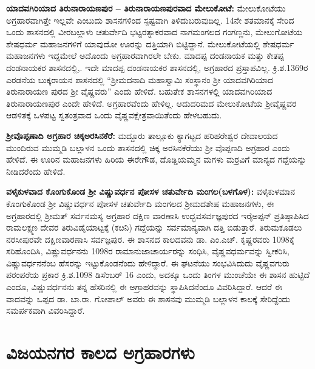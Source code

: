 \textbf{ಯಾದವಗಿರಿಯಾದ ತಿರುನಾರಾಯಣಪುರ – ತಿರುನಾರಾಯಣಪುರವಾದ ಮೇಲುಕೋಟೆ:} ಮೇಲುಕೋಟೆಯು ಅಗ್ರಹಾರವಾಗಿತ್ತೇ ಇಲ್ಲವೇ ಎಂಬುದು ಶಾಸನಗಳಿಂದ ಸ್ಪಷ್ಟವಾಗಿ ತಿಳಿದುಬರುವುದಿಲ್ಲ. 14ನೇ ಶತಮಾನಕ್ಕೆ ಸೇರಿದ ಒಂದು ಶಾಸನದಲ್ಲಿ ವೀರಬಲ್ಲಾಳು ಚತುರ್ವೇದಿ ಭಟ್ಟರತ್ನಾಕರವಾದ ನಾಗಮಂಗಲದ ಗಂಗಣ್ಣನು, ಮೇಲುಗೋಟೆಯ ಶೇಷಧರ್ಮ ಮಹಾಜನಗಳಿಗೆ ಯಾವುದೋ ಊರನ್ನು ದತ್ತಿಯಾಗಿ ಬಿಟ್ಟಿದ್ದಾನೆ. ಮೇಲುಕೋಟೆಯಲ್ಲಿ ಶೇಷಧರ್ಮ ಮಹಾಜನಗಳು ಇದ್ದಮೇಲೆ ಅದೊಂದು ಅಗ್ರಹಾರವಾಗಿರಲೇ ಬೇಕು. ಮಾದಪ್ಪ ದಂಡನಾಯಕ ಮತ್ತು ಕೇತಪ್ಪ ದಂಡನಾಯಕರ ಶಾಸನದಲ್ಲಿ,. ಇದೇ ಮಾದಪ್ಪ ದಂಡನಾಯಕರ ಶಾಸನದಲ್ಲಿ, ಅಗ್ರಹಾರದ ಪ್ರಸ್ತಾಪವಿಲ್ಲ. ಕ್ರಿ.ಶ.1369ರ ಎರಡನೆಯ ಬುಕ್ಕರಾಯನ ಶಾಸನದಲ್ಲಿ “ಶ‍್ರೀಮದನಾದಿ ಮಹಾಸ್ವಾಮಿ ಸಂಸ್ಥಾನಂ ಶ‍್ರೀ ಯಾದವಗಿರಿಯಾದ ತಿರುನಾರಾಯಣ ಪುರದ ಶ‍್ರೀ ವೈಷ್ಣವರು” ಎಂದು ಹೇಳಿದೆ. ಬಹುತೇಕ ಶಾಸನಗಳಲ್ಲಿ ಯಾದವಗಿರಿಯಾದ ತಿರುನಾರಾಯಣಪುರ ಎಂದೇ ಹೇಳಿದೆ. ಅಗ್ರಹಾರವೆಂದು ಹೇಳಿಲ್ಲ. ಆದುದರಿಮದ ಮೇಲುಕೋಟೆಯ ಶ‍್ರೀವೈಷ್ಣವರ ಆಡಳಿತಕ್ಕೆ ಒಳಪಟ್ಟ ಸ್ವತಂತ್ರವಾದ ಒಂದು ವೈಷ್ಣವಕ್ಷೇತ್ರವಾಯಿತೆಂದು ಹೇಳಬಹುದು. 

\textbf{ಶ‍್ರೀವೊಪ್ಪಣಾದಿ ಅಗ್ರಹಾರ ಚಿಕ್ಕಅರಸಿನಕೆರೆ:} ಮದ್ದೂರು ತಾಲ್ಲೂಕು ಕ್ಯಾಗಟ್ಟದ ಹರಿಹರೇಶ್ವರ ದೇವಾಲಯದ ಮುಂದಿರುವ ಮುಮ್ಮಡಿ ಬಲ್ಲಾಳನ ಒಂದು ಶಾಸನದಲ್ಲಿ ಚಿಕ್ಕ ಅರಸಿನಕೆರೆಯು ಶ‍್ರೀ ವೊಪ್ಪಣದಿ ಅಗ್ರಹಾರ ಎಂದು ಹೇಳಿದೆ. ಈ ಊರಿನ ಮಹಾಜನಗಳು ಹಿರಿಯ ಈರೇಗೌಡ, ದೊಡ್ಡಿಯಮ್ಮನ ಮಗಳು ಮರ್ರವಿಗೆ ಮಾನ್ಯದ ಗದ್ದೆಯನ್ನು ನೀಡಿದರೆಂದು ಹೇಳಿದೆ.

\textbf{ವಳೈಕುಳವಾದ ಕೊಂಗುಕೊಂಡ ಶ‍್ರೀ ವಿಷ್ಣುವರ್ಧನ ಪೋಸಳ ಚತುರ್ವೇದಿ ಮಂಗಲ(ಬಳಗೊಳ):} ವಳೈಕುಳಮಾನ ಕೊಂಗುಕೊಂಡ ಶ‍್ರೀ ವಿಷ್ಣುವರ್ಧನ ಪೋಸಳ ಚತುರ್ವೇದಿ ಮಂಗಲದ ಶ‍್ರೀಮದಶೇಷ ಮಹಾಜನಗಳು, ಈ ಅಗ್ರಹಾರದಲ್ಲಿ ಶ‍್ರೀಮತ್​ ಸರ್ವನಮಸ್ಯ ಅಗ್ರಹಾರ ದಕ್ಷಿಣ ವಾರಣಾಸಿ ಉದ್ಭವಸರ್ವಜ್ಞಪುರದ ಇರೈಅಪ್ಪನ್​ ಪ್ರತಿಷ್ಠಾಪಿಸಿದ ರಾಮಲಕ್ಷ್ಮಣ ದೇವರ ತಿರುವಿಡೈಯಾಟ್ಟಕ್ಕೆ (ಕೞನಿ) ಗದ್ದೆಯನ್ನು ಸರ್ವಮಾನ್ಯವಾಗಿ ದತ್ತಿ ಬಿಡುತ್ತಾರೆ. ತಿರುಮಕೂಡಲು ನರಸೀಪುರವೇ ದಕ್ಷಿಣವಾರಣಾಸಿ ಸರ್ವಜ್ಞಪುರ. ಈ ಶಾಸನದ ಕಾಲದವನು ಡಾ. ಎಂ.ಎಚ್​. ಕೃಷ್ಣರವರು 1098ಕ್ಕೆ ಸರಿಹೊಂದಿಸಿ, ವಿಷ್ಣುವರ್ಧನನು 1098ರ ರಾಮಾನುಜಾಚಾರ್ಯರನ್ನು ಸಂಧಿಸಿ, ವೈಷ್ಣವಧರ್ಮವನ್ನು ಸ್ವೀಕರಿಸಿ, ವಿಷ್ಣುವರ್ಧನನೆಂಬ ಹೆಸರನ್ನು ಇಟ್ಟುಕೊಂಡನೆಂದು ಹೇಳಿದ್ದಾರೆ. ಈ ಘಟನೆಯು ಸಂಭವಿಸಿದುದು ವೈಷ್ಣವಗುರು ಪರಂಪರೆಯ ಪ್ರಕಾರ ಕ್ರಿ.ಶ.1098 ಡಿಸೆಂಬರ್​ 16 ಎಂದು, ಅದಕ್ಕೂ ಒಂದು ತಿಂಗಳ ಮುಂಚೆಯೇ ಈ ಶಾಸನ ಹುಟ್ಟಿದೆ ಎಂದೂ, ವಿಷ್ಣುವರ್ಧನನು ತನ್ನ ಹೆಸರಿನಲ್ಲಿ ಈ ಅಗ್ರಾಹರವನ್ನು ಸ್ಥಾಪಿಸಿದನೆಂದೂ ವಿವರಿಸಿದ್ದಾರೆ. ಆದರೆ ಈ ವಾದವನ್ನು ಒಪ್ಪದ ಡಾ. ಬಾ.ರಾ. ಗೋಪಾಲ್​ ಅವರು ಈ ಶಾಸನವು ಮುಮ್ಮಡಿ ಬಲ್ಲಾಳನ ಕಾಲಕ್ಕೆ ಸೇರಿದ್ದೆಂದು ಸಮರ್ಪಕವಾಗಿ ವಿವರಿಸಿದ್ದಾರೆ.


\section{ವಿಜಯನಗರ ಕಾಲದ ಅಗ್ರಹಾರಗಳು}

